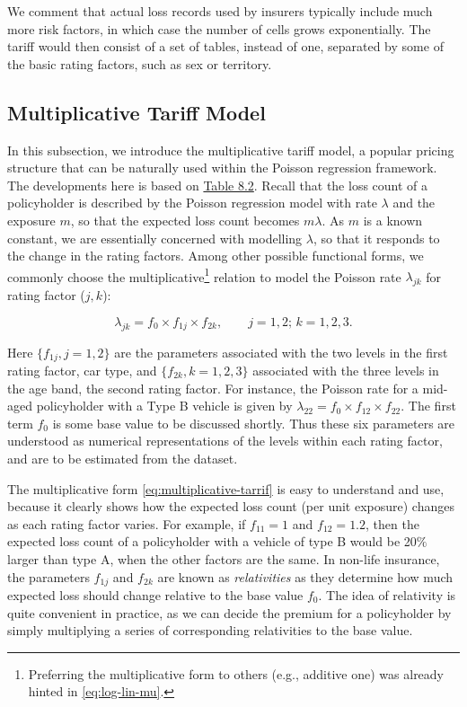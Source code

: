 \documentclass[]{book}
\let\rmarkdownfootnote\footnote%
\def\footnote{\protect\rmarkdownfootnote}
\theoremstyle{definition}
\theoremstyle{definition}
\theoremstyle{definition}
\theoremstyle{remark}
\begin{document}
We comment that actual loss records used by insurers typically include
much more risk factors, in which case the number of cells grows
exponentially. The tariff would then consist of a set of tables, instead
of one, separated by some of the basic rating factors, such as sex or
territory.

\subsection{Multiplicative Tariff
Model}\label{multiplicative-tariff-model}

In this subsection, we introduce the multiplicative tariff model, a
popular pricing structure that can be naturally used within the Poisson
regression framework. The developments here is based on
\protect\hyperlink{tab:8.2}{Table 8.2}. Recall that the loss count of a
policyholder is described by the Poisson regression model with rate
\(\lambda\) and the exposure \(m\), so that the expected loss count
becomes \(m\lambda\). As \(m\) is a known constant, we are essentially
concerned with modelling \(\lambda\), so that it responds to the change
in the rating factors. Among other possible functional forms, we
commonly choose the multiplicative\footnote{Preferring the
  multiplicative form to others (e.g., additive one) was already hinted
  in \eqref{eq:log-lin-mu}.} relation to model the Poisson rate
\(\lambda_{jk}\) for rating factor (\(j,k\)):

\begin{equation}
\lambda_{jk}= f_0 \times f_{1j} \times f_{2k}, \qquad j=1,2;\, k=1, 2,3.
\label{eq:multiplicative-tarrif}
\end{equation}

Here \(\{ f_{1j}, j=1,2\}\) are the parameters associated with the two
levels in the first rating factor, car type, and
\(\{ f_{2k}, k=1,2,3\}\) associated with the three levels in the age
band, the second rating factor. For instance, the Poisson rate for a
mid-aged policyholder with a Type B vehicle is given by
\(\lambda_{22}=f_0 \times f_{12} \times f_{22}\). The first term \(f_0\)
is some base value to be discussed shortly. Thus these six parameters
are understood as numerical representations of the levels within each
rating factor, and are to be estimated from the dataset.

The multiplicative form \eqref{eq:multiplicative-tarrif} is easy to
understand and use, because it clearly shows how the expected loss count
(per unit exposure) changes as each rating factor varies. For example,
if \(f_{11}=1\) and \(f_{12}=1.2\), then the expected loss count of a
policyholder with a vehicle of type B would be 20\(\%\) larger than type
A, when the other factors are the same. In non-life insurance, the
parameters \(f_{1j}\) and \(f_{2k}\) are known as \emph{relativities} as
they determine how much expected loss should change relative to the base
value \(f_0\). The idea of relativity is quite convenient in practice,
as we can decide the premium for a policyholder by simply multiplying a
series of corresponding relativities to the base value.
\end{document}

